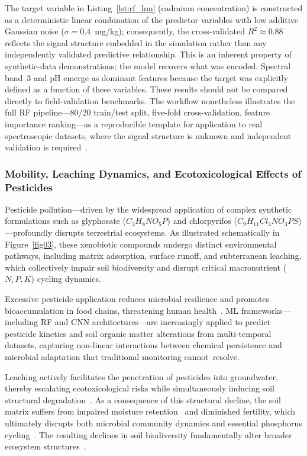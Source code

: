 \documentclass[environremediat,article,accept,pdftex,oneauthor]{Definitions/mdpi}
\begin{document}
{The target variable in Listing~\ref{lst:rf_hm} (cadmium concentration) is constructed as a deterministic linear combination of the predictor variables with low additive Gaussian noise ($\sigma = 0.4$~mg/kg); consequently, the cross-validated $R^2 \approx 0.88$ reflects the signal structure embedded in the simulation rather than any independently validated predictive relationship. This is an inherent property of synthetic-data demonstrations: the model recovers what was encoded. Spectral band~3 and pH emerge as dominant features because the target was explicitly defined as a function of these variables. These results should not be compared directly to field-validation benchmarks. The workflow nonetheless illustrates the full RF pipeline---80/20 train/test split, five-fold cross-validation, feature importance ranking---as a reproducible template for application to real spectroscopic datasets, where the signal structure is unknown and independent validation is required~\cite{MCLAUGHLIN1999143}.}

\subsubsection{Mobility, Leaching Dynamics, and Ecotoxicological Effects of
    Pesticides}\label{sec2.1.2}

Pesticide pollution—driven by the widespread application of complex synthetic formulations such as glyphosate ($C_3H_8NO_5P$) and chlorpyrifos ($C_9H_{11}Cl_3NO_3PS$)—profoundly disrupts terrestrial ecosystems. As illustrated schematically in Figure~\ref{fig03}, these xenobiotic compounds undergo distinct environmental pathways, including matrix adsorption, surface runoff, and subterranean leaching, which collectively impair soil biodiversity and disrupt critical macronutrient ($N, P, K$) cycling dynamics.

{Excessive pesticide application reduces microbial resilience and promotes bioaccumulation in food chains, threatening human health~\cite{GonzalezRodriguez2011,Nauanova2025}. ML frameworks---including RF and CNN architectures---are increasingly applied to predict pesticide kinetics and soil organic matter alterations from multi-temporal datasets, capturing non-linear interactions between chemical persistence and microbial adaptation that traditional monitoring \mbox{cannot resolve.}}

Leaching actively facilitates the penetration of pesticides into groundwater, thereby escalating ecotoxicological risks while simultaneously inducing soil structural degradation~\cite{Toumi2025,PerezLucas2025}. As a consequence of this structural decline, the soil matrix suffers from impaired moisture retention~\cite{Kelsey1968} and diminished fertility, which ultimately disrupts both microbial community dynamics and essential phosphorus cycling~\cite{Ponder2002,Yasir2025}. The resulting declines in soil biodiversity fundamentally alter broader ecosystem structures~\cite{Marcelino2024}. 
\end{document}
